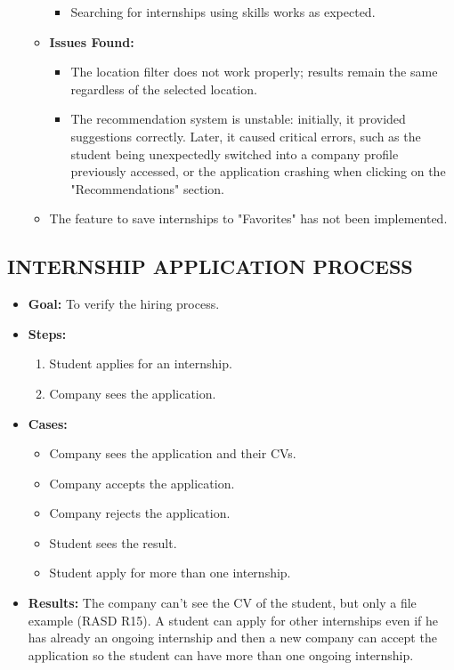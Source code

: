 \begin{itemize}
\begin{itemize}
\begin{itemize}
            \item Searching for internships using skills works as expected.
        \end{itemize}
        \item \textbf{Issues Found:}
        \begin{itemize}
            \item The location filter does not work properly; results remain the same regardless of the selected location.
            \item The recommendation system is unstable: initially, it provided suggestions correctly. Later, it caused critical errors, such as the student being unexpectedly switched into a company profile previously accessed, or the application crashing when clicking on the "Recommendations" section.
        \end{itemize}
        \item The feature to save internships to "Favorites" has not been implemented.
    \end{itemize}

\end{itemize}


\subsection{INTERNSHIP APPLICATION PROCESS}\label{subsec:internship-application-process}
\begin{itemize}
    \item \textbf{Goal:} To verify the hiring process.

    \item \textbf{Steps:}
    \begin{enumerate}
        \item Student applies for an internship.
        \item Company sees the application.
    \end{enumerate}
    \item \textbf{Cases:}
    \begin{itemize}
        \item Company sees the application and their CVs.
        \item Company accepts the application.
        \item Company rejects the application.
        \item Student sees the result.
        \item Student apply for more than one internship.
    \end{itemize}
    \item \textbf{Results:}
    The company can't see the CV of the student, but only a file example (RASD R15).
    A student can apply for other internships even if he has already an ongoing internship and then a new company can accept the application so the student can have more than one ongoing internship.

\end{itemize}

